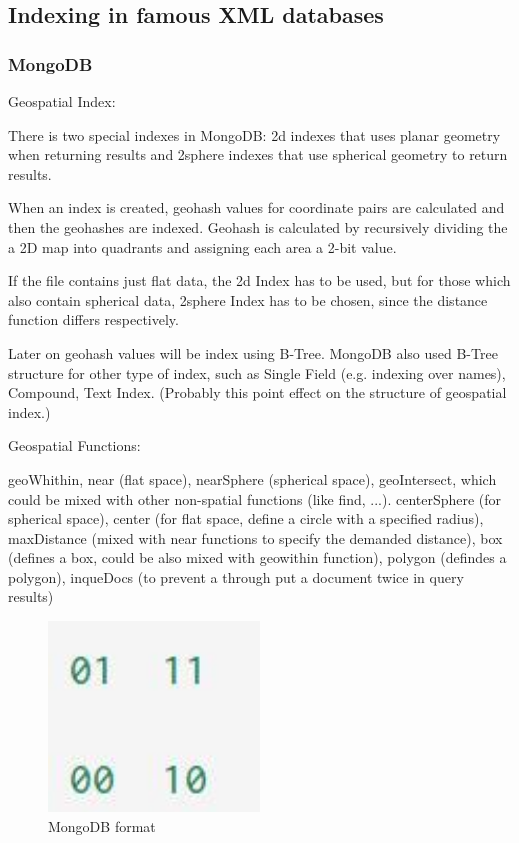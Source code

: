 \documentclass[a4paper,12pt]{article}
\begin{document}
\subsection{Indexing in famous XML databases}
\subsubsection{MongoDB}
\cite{mongogeneral2010}
\cite{mongoinaction2011}

Geospatial Index:

There is two special indexes in MongoDB: 2d indexes that uses planar geometry when returning results and 2sphere indexes that use spherical geometry to return results.

When an index is created, geohash values for coordinate pairs are calculated and then the geohashes are indexed.
Geohash is calculated by recursively dividing the a 2D map into quadrants and assigning each area a 2-bit value.


If the file contains just flat data, the 2d Index has to be used, but for those which also contain spherical data, 2sphere Index has to be chosen, since the distance function differs respectively.

Later on geohash values will be index using B-Tree. 
MongoDB also used B-Tree structure for other type of index, such as Single Field (e.g. indexing over names), Compound, Text Index. (Probably this point effect on the structure of geospatial index.)

Geospatial Functions:

geoWhithin, near (flat space), nearSphere (spherical space), geoIntersect, which could be mixed with other non-spatial functions (like find, ...). 
centerSphere (for spherical space), center (for flat space, define a circle with a specified radius), maxDistance (mixed with near functions to specify the demanded distance), box (defines a box, could be also mixed with geowithin function), polygon (defindes a polygon), inqueDocs (to prevent a through put a document twice in query results)

\begin{figure}
\centering
\includegraphics[width=0.5\textwidth]{mongoformat}
\caption{MongoDB format}
\label{fig1}
\end{figure}
\end{document}
